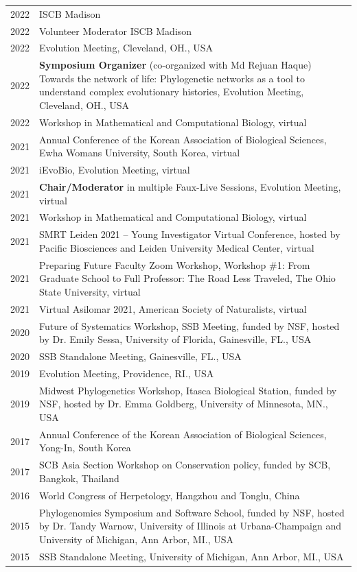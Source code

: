 \documentclass[11pt]{article}
\begin{document}
\begin{longtable}{p{}  p{}}


2022 &ISCB Madison\color{red}{$>>>$Coming soon!}\\
2022 &Volunteer Moderator ISCB Madison\color{red}{$>>>$Coming soon!}\\
2022 & Evolution Meeting, Cleveland, OH., USA\\
2022 & \textbf{Symposium Organizer} (co-organized with Md Rejuan Haque) Towards the network of life: Phylogenetic networks as a tool to understand complex evolutionary histories, Evolution Meeting, Cleveland, OH., USA\\
2022 & Workshop in Mathematical and Computational Biology, virtual\\
2021 & Annual Conference of the Korean Association of Biological Sciences, Ewha Womans University, South Korea, virtual\\
2021 & iEvoBio, Evolution Meeting, virtual\\
2021 & \textbf{Chair/Moderator} in multiple Faux-Live Sessions, Evolution Meeting, virtual\\
2021 & Workshop in Mathematical and Computational Biology, virtual\\
2021 & SMRT Leiden 2021 – Young Investigator Virtual Conference, hosted by Pacific Biosciences and Leiden University Medical Center, virtual\\
2021 & Preparing Future Faculty Zoom Workshop, Workshop \#1: From Graduate School to Full Professor: The Road Less Traveled, The Ohio State University, virtual\\
2021 & Virtual Asilomar 2021, American Society of Naturalists, virtual\\
2020 & Future of Systematics Workshop, SSB Meeting, funded by NSF, hosted by Dr. Emily Sessa, University of Florida, Gainesville, FL., USA\\
2020 & SSB Standalone Meeting, Gainesville, FL., USA\\
2019 & Evolution Meeting, Providence, RI., USA\\
2019 & Midwest Phylogenetics Workshop, Itasca Biological Station, funded by NSF, hosted by Dr. Emma Goldberg, University of Minnesota, MN., USA\\
2017 & Annual Conference of the Korean Association of Biological Sciences, Yong-In, South Korea\\
2017 & SCB Asia Section Workshop on Conservation policy, funded by SCB, Bangkok, Thailand\\
2016 & World Congress of Herpetology, Hangzhou and Tonglu, China\\
2015 & Phylogenomics Symposium and Software School, funded by NSF, hosted by Dr. Tandy Warnow, University of Illinois at Urbana-Champaign and University of Michigan, Ann Arbor, MI., USA\\
2015 & SSB Standalone Meeting, University of Michigan, Ann Arbor, MI., USA\vspace{5pt}\\
\end{longtable}
\end{document}
